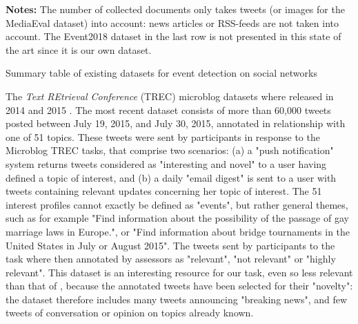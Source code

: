 \begin{table}
\begin{center}
\end{center}
\scriptsize \textbf{Notes:} The number of collected documents only takes tweets (or images for the MediaEval dataset) into account: news articles or RSS-feeds are not taken into account. The Event2018 dataset in the last row is not presented in this state of the art since it is our own dataset.
\caption{Summary table of existing datasets for event detection on social networks \label{Tab:datasets}}
\end{table}

The \textit{Text REtrieval Conference} (TREC) microblog datasets where released in 2014 \cite{lin2014overview} and 2015 \cite{lin2015overview}. The most recent dataset consists of more than 60,000 tweets posted between July 19, 2015, and July 30, 2015, annotated in relationship with one of 51 topics. These tweets were sent by participants in response to the Microblog TREC tasks, that comprise two scenarios: (a) a "push notification" system returns tweets considered as "interesting and novel" to a user having defined a topic of interest, and (b) a daily "email digest" is sent to a user with tweets containing relevant updates concerning her topic of interest. The 51 interest profiles cannot exactly be defined as "events", but rather general themes, such as for example "Find information about the possibility of the passage of gay marriage laws in Europe.", or "Find information about bridge tournaments in the United States in July or August 2015". The tweets sent by participants to the task where then annotated by assessors as "relevant", "not relevant" or "highly relevant". This dataset is an interesting resource for our task, even so less relevant than that of \citet{mcminn_building_2013}, because the annotated tweets have been selected for their "novelty": the dataset therefore includes many tweets announcing "breaking news", and few tweets of conversation or opinion on topics already known.

